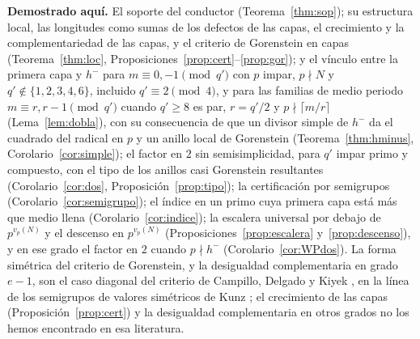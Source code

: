 \documentclass[11pt,a4paper]{article}
\theoremstyle{definition}
\begin{document}
\noindent\textbf{Demostrado aquí.} El soporte del conductor (Teorema~\ref{thm:sop}); su estructura local, las
longitudes como sumas de los defectos de las capas, el crecimiento y la complementariedad de las capas, y el criterio
de Gorenstein en capas (Teorema~\ref{thm:loc}, Proposiciones~\ref{prop:cert}--\ref{prop:gor}); y el vínculo entre la
primera capa y $h^-$ para $m\equiv0,-1\pmod{q'}$ con $p$ impar, $p\nmid N$ y $q'\notin\{1,2,3,4,6\}$, incluido
$q'\equiv2\pmod4$, y para las familias de medio periodo $m\equiv r,r-1\pmod{q'}$ cuando $q'\ge8$ es par, $r=q'/2$ y
$p\nmid\lceil m/r\rceil$ (Lema~\ref{lem:dobla}), con su consecuencia de que un divisor simple de $h^-$ da el cuadrado del radical en $p$ y un
anillo local de Gorenstein (Teorema~\ref{thm:hminus}, Corolario~\ref{cor:simple}); el factor en $2$ sin
semisimplicidad, para $q'$ impar primo y compuesto, con el tipo de los anillos casi Gorenstein resultantes
(Corolario~\ref{cor:dos}, Proposición~\ref{prop:tipo}); la certificación por semigrupos (Corolario~\ref{cor:semigrupo});
el índice en un primo cuya primera capa está más que medio llena (Corolario~\ref{cor:indice});
la escalera universal por debajo de $p^{v_p(N)}$ y el descenso en $p^{v_p(N)}$ (Proposiciones~\ref{prop:escalera}
y~\ref{prop:descenso}), y en ese grado el factor en $2$ cuando $p\nmid h^-$ (Corolario~\ref{cor:WPdos}). La forma simétrica del criterio de Gorenstein, y la
desigualdad complementaria en grado $e-1$, son el caso diagonal del criterio de Campillo, Delgado y Kiyek
\cite{CDK94}, en la línea de los semigrupos de valores simétricos de Kunz \cite{Kun70,Del87}; el crecimiento de las
capas (Proposición~\ref{prop:cert}) y la desigualdad complementaria en otros grados no los hemos encontrado en esa
literatura.
\end{document}
